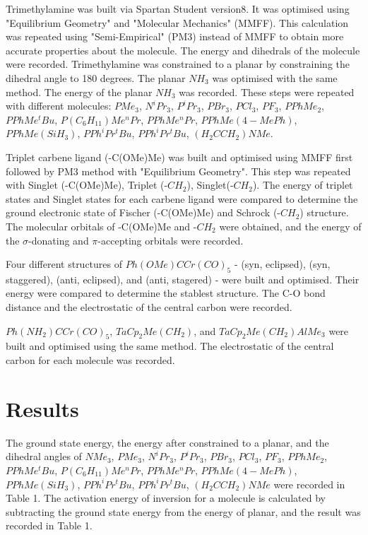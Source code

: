 \documentclass[twocolumn]{article} %
\begin{document}
Trimethylamine was built via Spartan Student version8. It was optimised using "Equilibrium Geometry" and "Molecular Mechanics" (MMFF). This calculation was repeated using "Semi-Empirical" (PM3) instead of MMFF to obtain more accurate properties about the molecule. The energy and dihedrals of the molecule were recorded. Trimethylamine was constrained to a planar by constraining the dihedral angle to 180 degrees. The planar $NH_3$ was optimised with the same method. The energy of the planar $NH_3$ was recorded. These steps were repeated with different molecules: $PMe_3$, $N^iPr_3$, $P^iPr_3$, $PBr_3$, $PCl_3$, $PF_3$, $PPhMe_2$, $PPhMe^tBu$, $P(C_6H_{11})Me^nPr$, $PPhMe^nPr$, $PPhMe(4-MePh)$, $PPhMe(SiH_3)$, $PPh^iPr^tBu$, $PPh^iPr^tBu$, $(H_2CCH_2)NMe$.

Triplet carbene ligand (-C(OMe)Me) was built and optimised using MMFF first followed by PM3 method with "Equilibrium Geometry". This step was repeated with Singlet (-C(OMe)Me), Triplet (-$CH_2$), Singlet(-$CH_2$). The energy of triplet states and Singlet states for each carbene ligand were compared to determine the ground electronic state of Fischer (-C(OMe)Me) and Schrock (-$CH_2$) structure. The molecular orbitals of -C(OMe)Me and -$CH_2$ were obtained, and the energy of the $\sigma$-donating and $\pi$-accepting orbitals were recorded. 

Four different structures of $Ph(OMe)CCr(CO)_5$ - (syn, eclipsed), (syn, staggered), (anti, eclipsed), and (anti, stagered) - were built and optimised. Their energy were compared to determine the stablest structure. The C-O bond distance and the electrostatic of the central carbon were recorded. 

$Ph(NH_2)CCr(CO)_5$, $TaCp_2Me(CH_2)$, and $TaCp_2Me(CH_2)AlMe_3$ were built and optimised using the same method. The electrostatic of the central carbon for each molecule was recorded. 




\section{Results}

The ground state energy, the energy after constrained to a planar, and the dihedral angles of $NMe_3$, $PMe_3$, $N^iPr_3$, $P^iPr_3$, $PBr_3$, $PCl_3$, $PF_3$, $PPhMe_2$, $PPhMe^tBu$, $P(C_6H_{11})Me^nPr$, $PPhMe^nPr$, $PPhMe(4-MePh)$, $PPhMe(SiH_3)$, $PPh^iPr^tBu$, $PPh^iPr^tBu$, $(H_2CCH_2)NMe$  were recorded in Table 1. The activation energy of inversion for a molecule is calculated by subtracting the ground state energy from the energy of planar, and the result was recorded in Table 1. 
\end{document}
